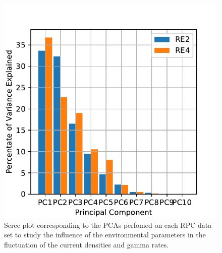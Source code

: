 	\begin{figure}
    	\centering
		\includegraphics[width = \linewidth]{fig/chapt5/Scree_plot_Irr-Ref-Ratio.pdf}
        \caption{\label{fig:GIFpp-Scree_Ratios} Scree plot corresponding to the PCAs perfomed on each RPC data set to study the influence of the environmental parameters in the fluctuation of the current densities and gamma rates.}
	\end{figure}
	
